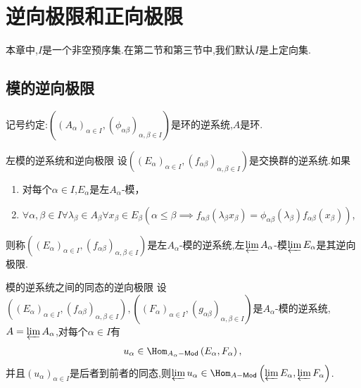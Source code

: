 \chapter{逆向极限和正向极限}

本章中,$I$是一个非空预序集.在第二节和第三节中,我们默认$I$是上定向集.

\section{模的逆向极限}

记号约定:$\left(\left(A_{\alpha}\right)_{\alpha\in I},\left(\phi_{\alpha\beta}\right)_{\alpha,\beta\in I}\right)$是环的逆系统,$A$是环.

\begin{definition}{左模的逆系统和逆向极限}{}
	设$\left(\left(E_{\alpha}\right)_{\alpha\in I},\left(f_{\alpha\beta}\right)_{\alpha,\beta\in I}\right)$是交换群的逆系统.如果
	\begin{enumerate}
		\item 对每个$\alpha\in I$,$E_{\alpha}$是左$A_{\alpha}$-模，
		\item $\forall\alpha,\beta\in I\forall\lambda_{\beta}\in A_{\beta}\forall x_{\beta}\in E_{\beta}\left(\alpha\leq\beta\implies f_{\alpha\beta}\left(\lambda_{\beta}x_{\beta}\right)=\phi_{\alpha\beta}\left(\lambda_{\beta}\right)f_{\alpha\beta}\left(x_{\beta}\right)\right)$,
	\end{enumerate}
	则称$\left(\left(E_{\alpha}\right)_{\alpha\in I},\left(f_{\alpha\beta}\right)_{\alpha,\beta\in I}\right)$是左$A_{\alpha}$-模的逆系统,左$\varprojlim A_{\alpha}$-模$\varprojlim E_{\alpha}$是其逆向极限.
\end{definition}

\begin{proposition}{模的逆系统之间的同态的逆向极限}{}
	设$\left(\left(E_{\alpha}\right)_{\alpha\in I},\left(f_{\alpha\beta}\right)_{\alpha,\beta\in I}\right),\left(\left(F_{\alpha}\right)_{\alpha\in I},\left(g_{\alpha\beta}\right)_{\alpha,\beta\in I}\right)$是$A_{\alpha}$-模的逆系统,$A=\varprojlim A_{\alpha}$,对每个$\alpha\in I$有
	\begin{align*}
		u_{\alpha}\in\Hom_{A_{\alpha}-\mathsf{Mod}}\left(E_{\alpha},F_{\alpha}\right),
	\end{align*}
	并且$\left(u_{\alpha}\right)_{\alpha\in I}$是后者到前者的同态,则$\varprojlim u_{\alpha}\in\Hom_{A-\mathsf{Mod}}\left(\varprojlim E_{\alpha},\varprojlim F_{\alpha}\right)$.
\end{proposition}

